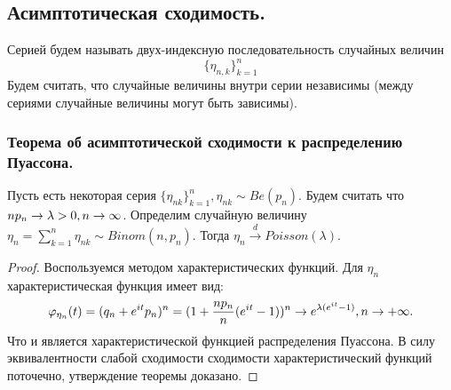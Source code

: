 \subsection{Асимптотическая сходимость.}
\begin{definition}
    Серией будем называть двух-индексную последовательность случайных величин
    \[
        \{\eta_{n, k}\}_{k = 1}^{n}
    \]
    Будем считать, что случайные величины внутри серии независимы (между сериями случайные величины могут быть зависимы).
\end{definition}
\subsubsection{Теорема об асимптотической сходимости к распределению Пуассона.}
\begin{theorem}[Пуассон]
    Пусть есть некоторая серия $\{\eta_{nk}\}_{k = 1}^n, \eta_{nk} \sim Be(p_n)$.
    Будем считать что $np_n \rightarrow \lambda > 0, n \rightarrow \infty$.
    Определим случайную величину $\eta_n = \sum\limits_{k = 1}^{n} \eta_{nk} \sim Binom(n, p_n)$.
    Тогда $\eta_n \xrightarrow{d} Poisson(\lambda)$.
\end{theorem}
\begin{proof}
    Воспользуемся методом характеристических функций.
    Для $\eta_n$ характеристическая функция имеет вид:
    \[
        \varphi_{\eta_n}(t) = (q_n + e^{it}p_n)^n = (1 + \frac{n p_n}{n}(e^{it} - 1))^n \rightarrow e^{\lambda(e^{it} - 1)}, n \rightarrow +\infty.
    \]
    Что и является характеристической функцией распределения Пуассона.
    В силу эквивалентности слабой сходимости сходимости характеристический функций поточечно, утверждение теоремы доказано.
\end{proof}
